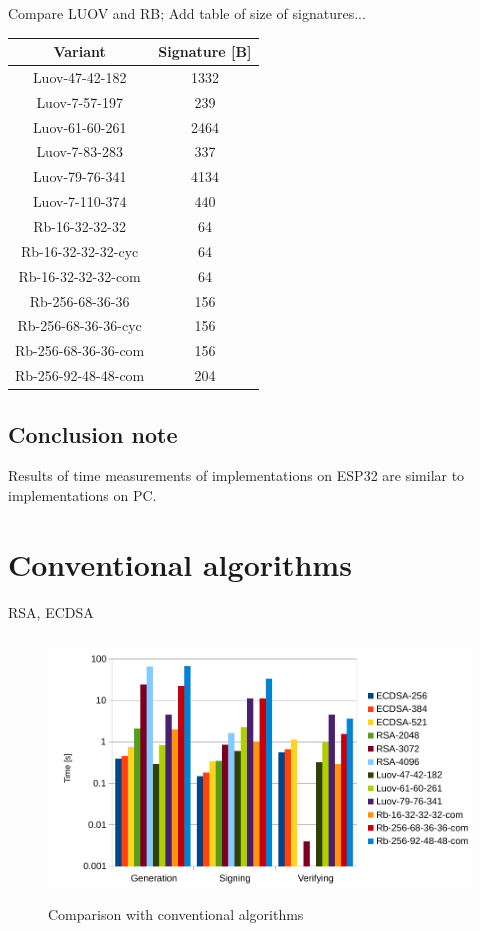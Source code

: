 \documentclass[thesis=M,english]{FITthesis}[2019/12/23]
\begin{document}
\noindent
Compare LUOV and RB; Add table of size of signatures...
\begin{table}[H]
\centering
\begin{tabular}{|c|c|}
\hline
Variant             & Signature {[}B{]} \\ \hline
Luov-47-42-182      & 1332              \\ \hline
Luov-7-57-197       & 239               \\ \hline
Luov-61-60-261      & 2464              \\ \hline
Luov-7-83-283       & 337               \\ \hline
Luov-79-76-341      & 4134              \\ \hline
Luov-7-110-374      & 440               \\ \hline
Rb-16-32-32-32      & 64                \\ \hline
Rb-16-32-32-32-cyc  & 64                \\ \hline
Rb-16-32-32-32-com  & 64                \\ \hline
Rb-256-68-36-36     & 156               \\ \hline
Rb-256-68-36-36-cyc & 156               \\ \hline
Rb-256-68-36-36-com & 156               \\ \hline
Rb-256-92-48-48-com & 204               \\ \hline
\end{tabular}
\end{table}

\newpage
\subsection{Conclusion note}
Results of time measurements of implementations on ESP32 are similar to implementations on PC.

\newpage
\section{Conventional algorithms}
RSA, ECDSA

\begin{figure}[H]
\centering
\includegraphics[width=13cm,height=7cm]{images/time-all.pdf}
\caption{Comparison with conventional algorithms}
\label{time-all}
\end{figure}
\end{document}

